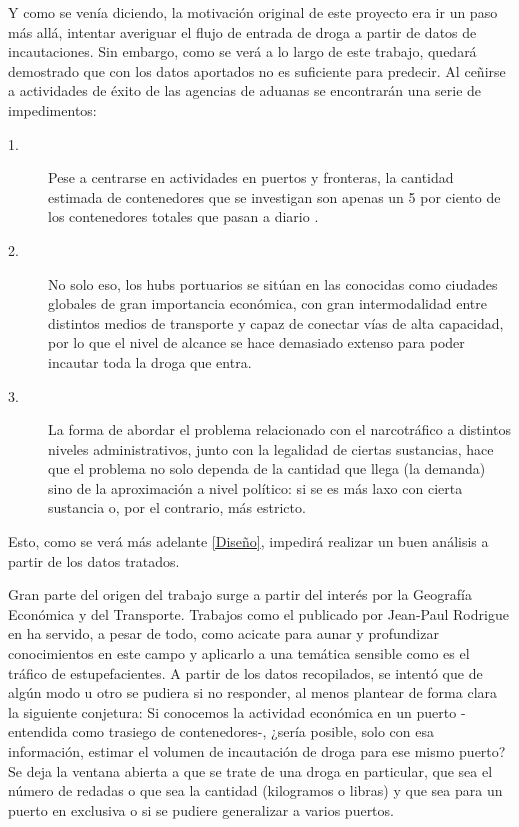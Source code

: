 \documentclass[12pt]{article}
\begin{document}
	Y como se venía diciendo, la motivación original de este proyecto era ir un paso más allá, intentar averiguar el flujo de entrada de droga a partir de datos de incautaciones. Sin embargo, como se verá a lo largo de este trabajo, quedará demostrado que con los datos aportados no es suficiente para predecir. Al ceñirse a actividades de éxito de las agencias de aduanas se encontrarán una serie de impedimentos:
	
	\begin{description}
		\item[1.] Pese a centrarse en actividades en puertos y fronteras, la cantidad estimada de contenedores que se investigan son apenas un 5 por ciento de los contenedores totales que pasan a diario \cite[]{}.
		\item[2.] No solo eso, los hubs portuarios se sitúan en las conocidas como ciudades globales \cite{} de gran importancia económica, con gran intermodalidad entre distintos medios de transporte y capaz de conectar vías de alta capacidad, por lo que el nivel de alcance se hace demasiado extenso para poder incautar toda la droga que entra.
		\item[3.] La forma de abordar el problema relacionado con el narcotráfico a distintos niveles administrativos, junto con la legalidad de ciertas sustancias, hace que el problema no solo dependa de la cantidad que llega (la demanda) sino de la aproximación a nivel político: si se es más laxo con cierta sustancia o, por el contrario, más estricto.
	\end{description}
	
	Esto, como se verá más adelante \ref{Diseño}, impedirá realizar un buen análisis a partir de los datos tratados.
	
	Gran parte del origen del trabajo surge a partir del interés por la Geografía Económica y del Transporte. Trabajos como el publicado por Jean-Paul Rodrigue en \cite[]{} ha servido, a pesar de todo, como acicate para aunar y profundizar conocimientos en este campo y aplicarlo a una temática sensible como es el tráfico de estupefacientes. A partir de los datos recopilados, se intentó que de algún modo u otro se pudiera si no responder, al menos plantear de forma clara la siguiente conjetura: Si conocemos la actividad económica en un puerto -entendida como trasiego de contenedores-, ¿sería posible, solo con esa información, estimar el volumen de incautación de droga para ese mismo puerto? Se deja la ventana abierta a que se trate de una droga en particular, que sea el número de redadas o que sea la cantidad (kilogramos o libras) y que sea para un puerto en exclusiva o si se pudiere generalizar a varios puertos.\
	 
\end{document}
